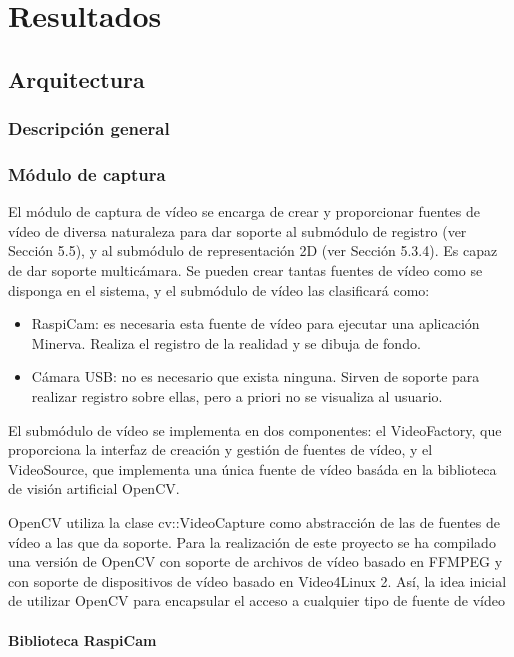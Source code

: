 \chapter{Resultados}
\label{chap:resultados}




\section{Arquitectura}
\subsection{Descripción general}
\subsection{Módulo de captura}
El módulo de captura de vídeo se encarga de crear y proporcionar fuentes de vídeo de diversa naturaleza para dar soporte al submódulo de registro (ver Sección 5.5), y al submódulo de representación 2D (ver Sección 5.3.4).
Es capaz de dar soporte multicámara. Se pueden crear tantas fuentes de vídeo como se disponga en el sistema, y el submódulo de vídeo las clasificará como: 
\begin{itemize}
\item RaspiCam: es necesaria esta fuente de vídeo para ejecutar una aplicación Minerva. Realiza el registro de la realidad y se dibuja de fondo.
\item Cámara USB: no es necesario que exista ninguna. Sirven de soporte para realizar registro sobre ellas, pero a priori no se visualiza al usuario.
\end{itemize}

El submódulo de vídeo se implementa en dos componentes: el VideoFactory, que proporciona la interfaz de creación y gestión de fuentes de vídeo, y el VideoSource, que implementa una única fuente de vídeo basáda en la biblioteca de visión artificial OpenCV.

OpenCV utiliza la clase cv::VideoCapture como abstracción de las de fuentes de vídeo a las que da soporte.
Para la realización de este proyecto se ha compilado una versión de OpenCV con soporte de archivos de vídeo basado en FFMPEG y con soporte de dispositivos de vídeo basado en Video4Linux 2. Así, la idea inicial de utilizar OpenCV para encapsular el acceso a cualquier tipo de fuente de vídeo 
\subsubsection{Biblioteca RaspiCam}



